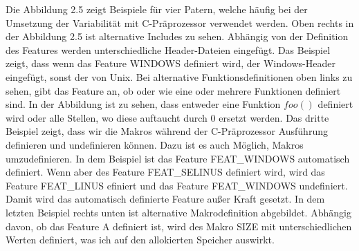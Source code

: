 \begin{figure}[t]
\end{figure}

Die Abbildung 2.5 zeigt Beispiele für vier Patern, welche häufig bei der Umsetzung der Variabilität mit C-Präprozessor verwendet werden. Oben rechts in der Abbildung 2.5 ist alternative Includes zu sehen. Abhängig von der Definition des Features werden unterschiedliche Header-Dateien eingefügt. Das Beispiel zeigt, dass wenn das Feature WINDOWS definiert wird, der Windows-Header eingefügt, sonst der von Unix. Bei alternative Funktionsdefinitionen oben links zu sehen, gibt das Feature an, ob oder wie eine oder mehrere Funktionen definiert sind. In der Abbildung ist zu sehen, dass entweder eine Funktion $foo()$ definiert wird oder alle Stellen, wo diese auftaucht durch 0 ersetzt werden. Das dritte Beispiel zeigt, dass wir die Makros während der C-Präprozessor Ausführung definieren und undefinieren können. Dazu ist es auch Möglich, Makros umzudefinieren. In dem Beispiel ist das Feature FEAT\_WINDOWS automatisch definiert. Wenn aber des Feature FEAT\_SELINUS definiert wird, wird das Feature FEAT\_LINUS efiniert und das Feature FEAT\_WINDOWS undefiniert. Damit wird das automatisch definierte Feature außer Kraft gesetzt. In dem letzten Beispiel rechts unten ist alternative Makrodefinition abgebildet. Abhängig davon, ob das Feature A definiert ist, wird des Makro SIZE mit unterschiedlichen Werten definiert, was ich auf den allokierten Speicher auswirkt.


